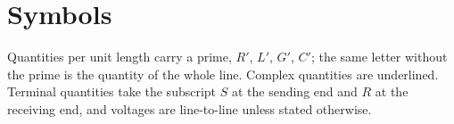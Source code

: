 \section{Symbols}
\label{sec:symbols}

Quantities per unit length carry a prime, $R'$, $L'$, $G'$, $C'$; the same
letter without the prime is the quantity of the whole line. Complex
quantities are underlined. Terminal quantities take the subscript $S$ at the
sending end and $R$ at the receiving end, and voltages are line-to-line
unless stated otherwise.

